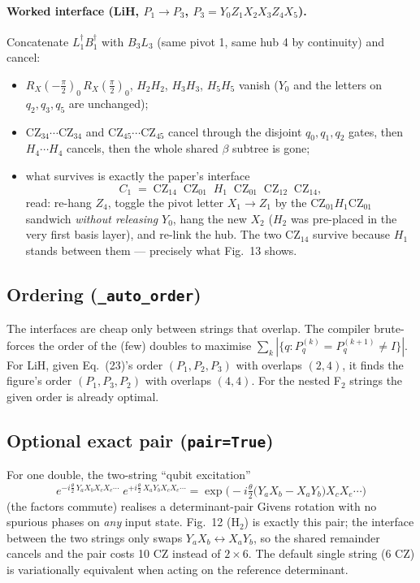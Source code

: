 \documentclass[11pt]{article}
\newcommand{\RX}{R_X}
\newcommand{\CZ}{\mathrm{CZ}}
\newcommand{\code}[1]{\texttt{#1}}
\begin{document}
\paragraph{Worked interface (LiH, $P_1\!\to\!P_3$,
$P_3=Y_0Z_1X_2X_3Z_4X_5$).}
Concatenate $L_1^{\dagger}B_1^{\dagger}$ with $B_3L_3$ (same pivot 1, same
hub 4 by continuity) and cancel:
\begin{itemize}
\item $\RX(-\frac{\pi}{2})_0\,\RX(\frac{\pi}{2})_0$, $H_2H_2$, $H_3H_3$,
  $H_5H_5$ vanish ($Y_0$ and the letters on $q_2,q_3,q_5$ are unchanged);
\item $\CZ_{34}\cdots\CZ_{34}$ and $\CZ_{45}\cdots\CZ_{45}$ cancel through
  the disjoint $q_0,q_1,q_2$ gates, then $H_4 \cdots H_4$ cancels, then
  the whole shared $\beta$ subtree is gone;
\item what survives is exactly the paper's interface
\begin{equation*}
  C_1 \;=\; \CZ_{14}\;\; \CZ_{01}\;\; H_1\;\; \CZ_{01}\;\; \CZ_{12}\;\;
  \CZ_{14},
\end{equation*}
  read: re-hang $Z_4$, toggle the pivot letter $X_1\!\to\!Z_1$ by the
  $\CZ_{01} H_1 \CZ_{01}$ sandwich \emph{without releasing} $Y_0$, hang
  the new $X_2$ ($H_2$ was pre-placed in the very first basis layer), and
  re-link the hub. The two $\CZ_{14}$ survive because $H_1$ stands
  between them --- precisely what Fig.~13 shows.
\end{itemize}

\subsection{Ordering (\code{\_auto\_order})}
The interfaces are cheap only between strings that overlap. The compiler
brute-forces the order of the (few) doubles to maximise
$\sum_k |\{q: P^{(k)}_q = P^{(k+1)}_q \neq I\}|$. For LiH, given
Eq.~(23)'s order $(P_1,P_2,P_3)$ with overlaps $(2,4)$, it finds the
figure's order $(P_1,P_3,P_2)$ with overlaps $(4,4)$. For the nested
F$_2$ strings the given order is already optimal.

\subsection{Optional exact pair (\code{pair=True})}
For one double, the two-string ``qubit excitation''
\begin{equation}
e^{-i\frac{\theta}{2}\,Y_aX_bX_cX_e\cdots}\;
e^{+i\frac{\theta}{2}\,X_aY_bX_cX_e\cdots}
=\exp\Big(\!-i\tfrac{\theta}{2}\big(Y_aX_b-X_aY_b\big)X_cX_e\cdots\Big)
\end{equation}
(the factors commute) realises a determinant-pair Givens rotation with no
spurious phases on \emph{any} input state. Fig.~12 (H$_2$) is exactly
this pair; the interface between the two strings only swaps
$Y_aX_b \leftrightarrow X_aY_b$, so the shared remainder cancels and the
pair costs 10 CZ instead of $2\times 6$. The default single string (6 CZ)
is variationally equivalent when acting on the reference determinant.
\end{document}
